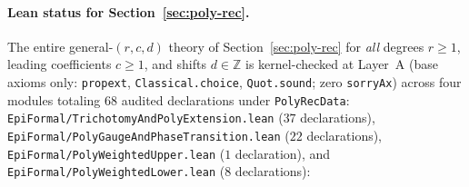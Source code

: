 \documentclass[11pt]{article}
\theoremstyle{definition}
\theoremstyle{remark}
\newcommand{\Z}{\mathbb{Z}}
\begin{document}
\paragraph{Lean status for Section~\ref{sec:poly-rec}.}
The entire general-$(r,c,d)$ theory of Section~\ref{sec:poly-rec} for
\emph{all} degrees $r\ge1$, leading coefficients $c\ge1$, and shifts $d\in\Z$
is kernel-checked at Layer~A (base axioms only: \texttt{propext},
\texttt{Classical.choice}, \texttt{Quot.sound}; zero \texttt{sorryAx}) across
four modules totaling $68$ audited declarations under \texttt{PolyRecData}:
\texttt{EpiFormal/\allowbreak TrichotomyAndPolyExtension.lean} ($37$
declarations), \texttt{EpiFormal/\allowbreak PolyGaugeAndPhaseTransition.lean}
($22$ declarations), \texttt{EpiFormal/\allowbreak PolyWeightedUpper.lean} ($1$
declaration), and \texttt{EpiFormal/\allowbreak PolyWeightedLower.lean} ($8$
declarations):
\end{document}
